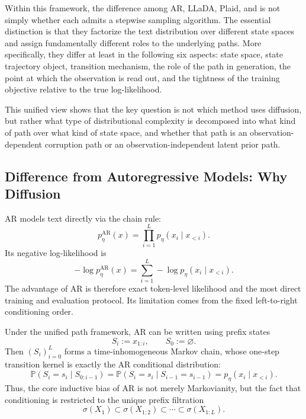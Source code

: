 Within this framework, the difference among AR, LLaDA, Plaid, and \method is not simply whether each admits a stepwise sampling algorithm. The essential distinction is that they factorize the text distribution over different state spaces and assign fundamentally different roles to the underlying paths. More specifically, they differ at least in the following six aspects: state space, state trajectory object, transition mechanism, the role of the path in generation, the point at which the observation is read out, and the tightness of the training objective relative to the true log-likelihood.

This unified view shows that the key question is not which method uses diffusion, but rather what type of distributional complexity is decomposed into what kind of path over what kind of state space, and whether that path is an observation-dependent corruption path or an observation-independent latent prior path.

\subsection{Difference from Autoregressive Models: Why Diffusion}
\label{app:why_diffusion}

AR models text directly via the chain rule:
\begin{equation}
p_{\eta}^{\mathrm{AR}}(x)=\prod_{i=1}^{L} p_{\eta}(x_i\mid x_{<i}).
\label{eq:app_ar_factorization}
\end{equation}
Its negative log-likelihood is
\begin{equation}
-\log p_{\eta}^{\mathrm{AR}}(x)=\sum_{i=1}^{L}-\log p_{\eta}(x_i\mid x_{<i}).
\label{eq:app_ar_nll}
\end{equation}
The advantage of AR is therefore exact token-level likelihood and the most direct training and evaluation protocol. Its limitation comes from the fixed left-to-right conditioning order.

Under the unified path framework, AR can be written using prefix states
\begin{equation}
S_i:=x_{1:i},
\qquad S_0:=\varnothing.
\label{eq:app_prefix_state_def}
\end{equation}
Then $(S_i)_{i=0}^{L}$ forms a time-inhomogeneous Markov chain, whose one-step transition kernel is exactly the AR conditional distribution:
\begin{equation}
\mathbb P(S_i=s_i\mid S_{0:i-1})
=
\mathbb P(S_i=s_i\mid S_{i-1}=s_{i-1})
=
p_{\eta}(x_i\mid x_{<i}).
\label{eq:app_ar_as_markov_chain}
\end{equation}
Thus, the core inductive bias of AR is not merely Markovianity, but the fact that conditioning is restricted to the unique prefix filtration
\begin{equation}
\sigma(X_1)\subset \sigma(X_{1:2})\subset \cdots \subset \sigma(X_{1:L}).
\label{eq:app_ar_filtration}
\end{equation}

